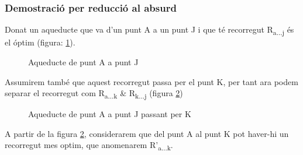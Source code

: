 \documentclass[12pt, letterpaper]{article}
\begin{document}
\newpage
\subsubsection{Demostració per reducció al absurd}
Donat un aqueducte que va d'un punt A a un punt J i que té recorregut R\textsubscript{a...j} és el óptim (figura: \ref{demostracio:atoj}).

\begin{figure}[htbp]
\begin{center}
\caption{Aqueducte de punt A a punt J}
\label{demostracio:atoj}
\end{center}
\end{figure}

Assumirem també que aquest recorregut passa per el punt K, per tant ara podem separar el recorregut com R\textsubscript{a...k} \& R\textsubscript{k...j} (figura \ref{demostracio:atoktoj})

\begin{figure}[htbp]
\begin{center}
\caption{Aqueducte de punt A a punt J passant per K}
\label{demostracio:atoktoj}
\end{center}
\end{figure}

A partir de la figura \ref{demostracio:atoktoj}, considerarem que del punt A al punt K pot haver-hi un recorregut mes optim, que anomenarem R'\textsubscript{a...k}.
\end{document}
